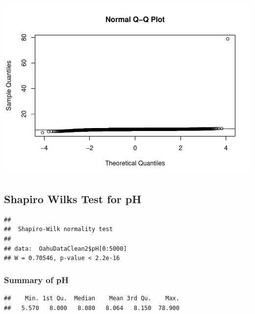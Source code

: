 \documentclass[12pt,]{article}
\newenvironment{Shaded}{\begin{snugshade}}{\end{snugshade}}
\newcommand{\KeywordTok}[1]{\textcolor[rgb]{0.13,0.29,0.53}{\textbf{#1}}}
\newcommand{\DecValTok}[1]{\textcolor[rgb]{0.00,0.00,0.81}{#1}}
\newcommand{\OperatorTok}[1]{\textcolor[rgb]{0.81,0.36,0.00}{\textbf{#1}}}
\newcommand{\NormalTok}[1]{#1}
\begin{document}
\includegraphics{Garcia_ENV872_Project_files/figure-latex/unnamed-chunk-28-1.pdf}

\subsection{Shapiro Wilks Test for pH}\label{shapiro-wilks-test-for-ph}

\begin{Shaded}
\end{Shaded}

\begin{verbatim}
## 
##  Shapiro-Wilk normality test
## 
## data:  OahuDataClean2$pH[0:5000]
## W = 0.70546, p-value < 2.2e-16
\end{verbatim}

\subsubsection{Summary of pH}\label{summary-of-ph}

\begin{Shaded}
\end{Shaded}

\begin{verbatim}
##    Min. 1st Qu.  Median    Mean 3rd Qu.    Max. 
##   5.570   8.000   8.080   8.064   8.150  78.900
\end{verbatim}
\end{document}
